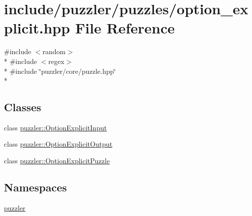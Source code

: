 \hypertarget{a00132}{}\section{include/puzzler/puzzles/option\+\_\+explicit.hpp File Reference}
\label{a00132}
{\ttfamily \#include $<$random$>$}\\*
{\ttfamily \#include $<$regex$>$}\\*
{\ttfamily \#include \char`\"{}puzzler/core/puzzle.\+hpp\char`\"{}}\\*
\subsection*{Classes}
\begin{DoxyCompactItemize}
\item 
class \hyperlink{a00019}{puzzler\+::\+Option\+Explicit\+Input}
\item 
class \hyperlink{a00020}{puzzler\+::\+Option\+Explicit\+Output}
\item 
class \hyperlink{a00022}{puzzler\+::\+Option\+Explicit\+Puzzle}
\end{DoxyCompactItemize}
\subsection*{Namespaces}
\begin{DoxyCompactItemize}
\item 
 \hyperlink{a00145}{puzzler}
\end{DoxyCompactItemize}
